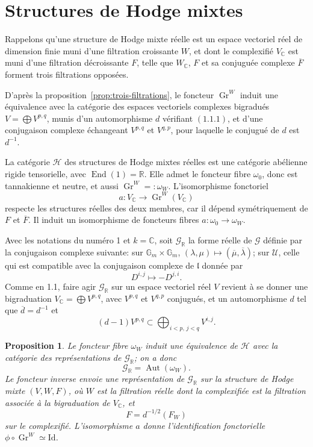 \documentclass[11pt]{article}
\newtheorem{proposition}{Proposition}[section]
\newcommand{\Gr}{\operatorname{Gr}}
\newcommand{\Aut}{\operatorname{Aut}}
\newcommand{\End}{\operatorname{End}}
\newcommand{\Gm}{\mathbb G_m}
\begin{document}
\section{Structures de Hodge mixtes}

Rappelons qu'une structure de Hodge mixte réelle est un espace vectoriel réel de dimension finie muni d'une filtration croissante \(W\), et dont le complexifié \(V_\mathbb C\) est muni d'une filtration décroissante \(F\), telle que \(W_\mathbb C\), \(F\) et sa conjuguée complexe \(\overline F\) forment trois filtrations opposées.

D'après la proposition~\ref{prop:trois-filtrations}, le foncteur \(\Gr^W\) induit une équivalence avec la catégorie des espaces vectoriels complexes bigradués \(V=\bigoplus V^{p,q}\), munis d'un automorphisme \(d\) vérifiant \((1.1.1)\), et d'une conjugaison complexe échangeant \(V^{p,q}\) et \(V^{q,p}\), pour laquelle le conjugué de \(d\) est \(d^{-1}\).

La catégorie \(\mathcal H\) des structures de Hodge mixtes réelles est une catégorie abélienne rigide tensorielle, avec \(\End(1)=\mathbb R\). Elle admet le foncteur fibre \(\omega_0\), donc est tannakienne et neutre, et aussi \(\Gr^W=:\omega_W\). L'isomorphisme fonctoriel
\[
 a:V_\mathbb C\longrightarrow \Gr^W(V_\mathbb C)
\]
respecte les structures réelles des deux membres, car il dépend symétriquement de \(F\) et \(\overline F\). Il induit un isomorphisme de foncteurs fibres \(a:\omega_0\to\omega_W\).

Avec les notations du numéro 1 et \(k=\mathbb C\), soit \(\mathcal G_\mathbb R\) la forme réelle de \(\mathcal G\) définie par la conjugaison complexe suivante: sur \(\Gm\times\Gm\), \((\lambda,\mu)\mapsto(\overline\mu,\overline\lambda)\); sur \(\mathcal U\), celle qui est compatible avec la conjugaison complexe de \(\mathfrak l\) donnée par
\[
 D^{i,j}\longmapsto -D^{j,i}.
\]
Comme en 1.1, faire agir \(\mathcal G_\mathbb R\) sur un espace vectoriel réel \(V\) revient à se donner une bigraduation \(V_\mathbb C=\bigoplus V^{p,q}\), avec \(V^{p,q}\) et \(V^{q,p}\) conjugués, et un automorphisme \(d\) tel que \(\overline d=d^{-1}\) et
\[
   (d-1)V^{p,q}\subset\bigoplus_{i<p,\,j<q}V^{i,j}.
\]

\begin{proposition}
Le foncteur fibre \(\omega_W\) induit une équivalence de \(\mathcal H\) avec la catégorie des représentations de \(\mathcal G_\mathbb R\); on a donc
\[
 \mathcal G_\mathbb R=\Aut(\omega_W).
\]
Le foncteur inverse envoie une représentation de \(\mathcal G_\mathbb R\) sur la structure de Hodge mixte \((V,W,F)\), où \(W\) est la filtration réelle dont la complexifiée est la filtration associée à la bigraduation de \(V_\mathbb C\), et
\[
 F=d^{-1/2}(F_W)
\]
sur le complexifié. L'isomorphisme \(a\) donne l'identification fonctorielle \(\phi\circ\Gr^W\simeq\mathrm{Id}\).
\end{proposition}
\end{document}
